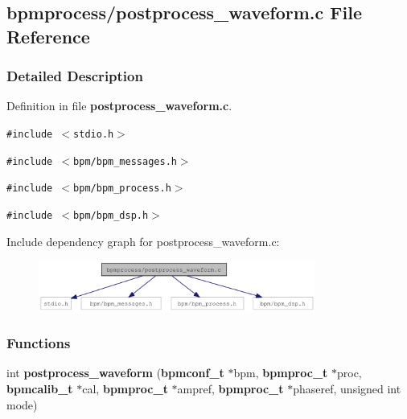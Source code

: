 \subsection{bpmprocess/postprocess\_\-waveform.c File Reference}
\label{postprocess__waveform_8c}


\subsubsection{Detailed Description}


Definition in file {\bf postprocess\_\-waveform.c}.

{\tt \#include $<$stdio.h$>$}\par
{\tt \#include $<$bpm/bpm\_\-messages.h$>$}\par
{\tt \#include $<$bpm/bpm\_\-process.h$>$}\par
{\tt \#include $<$bpm/bpm\_\-dsp.h$>$}\par


Include dependency graph for postprocess\_\-waveform.c:\nopagebreak
\begin{figure}[H]
\begin{center}
\leavevmode
\includegraphics[width=257pt]{postprocess__waveform_8c__incl}
\end{center}
\end{figure}
\subsubsection*{Functions}
\begin{CompactItemize}
\item 
int {\bf postprocess\_\-waveform} ({\bf bpmconf\_\-t} $\ast$bpm, {\bf bpmproc\_\-t} $\ast$proc, {\bf bpmcalib\_\-t} $\ast$cal, {\bf bpmproc\_\-t} $\ast$ampref, {\bf bpmproc\_\-t} $\ast$phaseref, unsigned int mode)
\end{CompactItemize}
